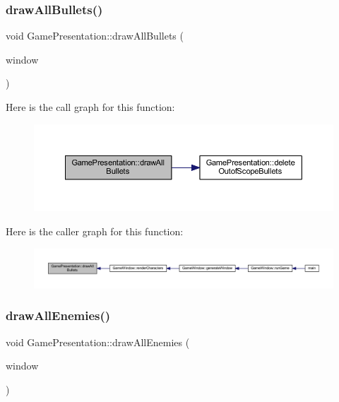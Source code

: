 \subsubsection{\texorpdfstring{draw\+All\+Bullets()}{drawAllBullets()}}
{\footnotesize\ttfamily void Game\+Presentation\+::draw\+All\+Bullets (\begin{DoxyParamCaption}\item[{Render\+Window \&}]{window }\end{DoxyParamCaption})}

Here is the call graph for this function\+:\nopagebreak
\begin{figure}[H]
\begin{center}
\leavevmode
\includegraphics[width=350pt]{class_game_presentation_a874688a19d648902d43751a198e2d9ab_cgraph}
\end{center}
\end{figure}
Here is the caller graph for this function\+:\nopagebreak
\begin{figure}[H]
\begin{center}
\leavevmode
\includegraphics[width=350pt]{class_game_presentation_a874688a19d648902d43751a198e2d9ab_icgraph}
\end{center}
\end{figure}
\mbox{\label{class_game_presentation_af29e04c4a89f0a6d1ca9eab33da5ace5}} 
\subsubsection{\texorpdfstring{draw\+All\+Enemies()}{drawAllEnemies()}}
{\footnotesize\ttfamily void Game\+Presentation\+::draw\+All\+Enemies (\begin{DoxyParamCaption}\item[{Render\+Window \&}]{window }\end{DoxyParamCaption})}

